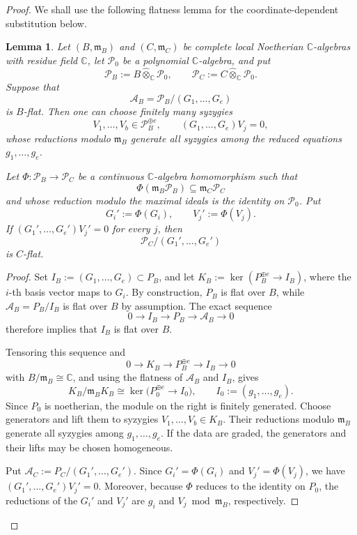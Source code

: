 \documentclass[11pt]{amsart}
\numberwithin{equation}{section}
\theoremstyle{plain}
\newtheorem{lemma}[theorem]{Lemma}
\theoremstyle{definition}
\newcommand{\0}{$0$-mutable}
\newcommand{\CC}{\ensuremath{\mathbb{C}}}
\renewcommand{\1}{$1$-rigid}
\renewcommand{\0}{$0$-mutable}
\begin{document}
\begin{proof}
We shall use the following flatness lemma for the coordinate-dependent
substitution below.

\begin{lemma}\label{lem coordinate dependent substitution}
Let \((B,\mathfrak m_B)\) and \((C,\mathfrak m_C)\) be complete local
Noetherian \(\CC\)-algebras with residue field \(\CC\), let
\(\mathcal P_0\) be a polynomial \(\CC\)-algebra, and put
\[
\mathcal P_B:=B\widehat\otimes_{\CC}\mathcal P_0,
\qquad
\mathcal P_C:=C\widehat\otimes_{\CC}\mathcal P_0.
\]
Suppose that
\[
\mathcal A_B
=
\mathcal P_B/(G_1,\ldots,G_e)
\]
is \(B\)-flat. Then one can choose finitely many syzygies
\[
V_1,\ldots,V_b\in\mathcal P_B^{\oplus e},
\qquad
(G_1,\ldots,G_e)V_j=0,
\]
whose reductions modulo \(\mathfrak m_B\) generate all syzygies among
the reduced equations \(g_1,\ldots,g_e\).

Let
\(\Phi\colon\mathcal P_B\to\mathcal P_C\) be a continuous
\(\CC\)-algebra homomorphism such that
\[
\Phi(\mathfrak m_B\mathcal P_B)
\subseteq
\mathfrak m_C\mathcal P_C
\]
and whose reduction modulo the maximal ideals is the identity on
\(\mathcal P_0\). Put
\[
G_i':=\Phi(G_i),
\qquad
V_j':=\Phi(V_j).
\]
If \((G_1',\ldots,G_e')V_j'=0\) for every \(j\), then
\[
\mathcal P_C/(G_1',\ldots,G_e')
\]
is \(C\)-flat.
\end{lemma}


\begin{proof}
Set \(I_B:=(G_1,\ldots,G_e)\subset P_B\), and let
\(K_B:=\ker(P_B^{\oplus e}\to I_B)\), where the \(i\)-th basis vector
maps to \(G_i\). By construction, \(P_B\) is flat over \(B\), while
\(\mathcal A_B=P_B/I_B\) is flat over \(B\) by assumption. The exact sequence
\[
0\longrightarrow I_B\longrightarrow P_B\longrightarrow \mathcal A_B
\longrightarrow0
\]
therefore implies that \(I_B\) is flat over \(B\).

Tensoring this sequence and
\[
0\longrightarrow K_B\longrightarrow P_B^{\oplus e}
\longrightarrow I_B\longrightarrow0
\]
with \(B/\mathfrak m_B\cong\CC\), and using the flatness of \(\mathcal A_B\)
and \(I_B\), gives
\[
K_B/\mathfrak m_BK_B
\cong
\ker\bigl(P_0^{\oplus e}\longrightarrow I_0\bigr),
\qquad
I_0:=(g_1,\ldots,g_e).
\]
Since \(P_0\) is noetherian, the module on the right is finitely
generated. Choose generators and lift them to syzygies
\(V_1,\ldots,V_b\in K_B\). Their reductions modulo
\(\mathfrak m_B\) generate all syzygies among \(g_1,\ldots,g_e\).
If the data are graded, the generators and their lifts may be chosen
homogeneous.

Put \(\mathcal A_C:=P_C/(G_1',\ldots,G_e')\). Since
\(G_i'=\Phi(G_i)\) and \(V_j'=\Phi(V_j)\), we have
\((G_1',\ldots,G_e')V_j'=0\). Moreover, because \(\Phi\) reduces to
the identity on \(P_0\), the reductions of the \(G_i'\) and \(V_j'\)
are \(g_i\) and \(V_j\bmod\mathfrak m_B\), respectively.


\end{proof}
\end{proof}
\end{document}
